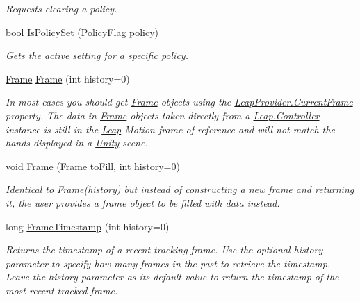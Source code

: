 \begin{DoxyCompactItemize}
\begin{DoxyCompactList}\small\item\em Requests clearing a policy. \end{DoxyCompactList}\item 
bool \mbox{\hyperlink{class_leap_1_1_controller_af0f85f9c36a57143107952afc26ec5d4}{Is\+Policy\+Set}} (\mbox{\hyperlink{class_leap_1_1_controller_a0bdb49fa94aa2da8b098c1ac296528d6}{Policy\+Flag}} policy)
\begin{DoxyCompactList}\small\item\em Gets the active setting for a specific policy. \end{DoxyCompactList}\item 
\mbox{\hyperlink{class_leap_1_1_frame}{Frame}} \mbox{\hyperlink{class_leap_1_1_controller_ac41dc9c50a3bd2a892cc44af0859ef0d}{Frame}} (int history=0)
\begin{DoxyCompactList}\small\item\em In most cases you should get \mbox{\hyperlink{class_leap_1_1_frame}{Frame}} objects using the \mbox{\hyperlink{class_leap_1_1_unity_1_1_leap_provider_a9a5cf65099912311c37f340d3be7e454}{Leap\+Provider.\+Current\+Frame}} property. The data in \mbox{\hyperlink{class_leap_1_1_frame}{Frame}} objects taken directly from a \mbox{\hyperlink{class_leap_1_1_controller}{Leap.\+Controller}} instance is still in the \mbox{\hyperlink{namespace_leap}{Leap}} Motion frame of reference and will not match the hands displayed in a \mbox{\hyperlink{namespace_leap_1_1_unity}{Unity}} scene. \end{DoxyCompactList}\item 
void \mbox{\hyperlink{class_leap_1_1_controller_acab28236972c254e53d3508cb8aaa1cd}{Frame}} (\mbox{\hyperlink{class_leap_1_1_frame}{Frame}} to\+Fill, int history=0)
\begin{DoxyCompactList}\small\item\em Identical to Frame(history) but instead of constructing a new frame and returning it, the user provides a frame object to be filled with data instead. \end{DoxyCompactList}\item 
long \mbox{\hyperlink{class_leap_1_1_controller_a3babd82558546e8bc5de90fb80d201ec}{Frame\+Timestamp}} (int history=0)
\begin{DoxyCompactList}\small\item\em Returns the timestamp of a recent tracking frame. Use the optional history parameter to specify how many frames in the past to retrieve the timestamp. Leave the history parameter as it\textquotesingle{}s default value to return the timestamp of the most recent tracked frame. \end{DoxyCompactList}\item 

\end{DoxyCompactItemize}
